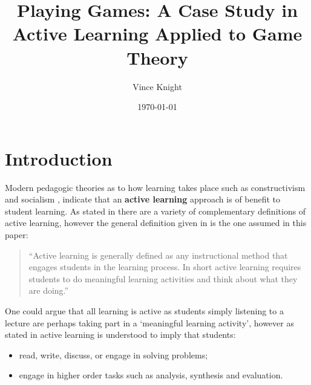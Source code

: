 \documentclass[12pt]{article}
\title{Playing Games: A Case Study in Active Learning Applied to Game Theory}
\author{Vince Knight}
\date{\today}
\begin{document}
\maketitle


\section{Introduction}\label{sec:introduction}

Modern pedagogic theories as to how learning takes place such as constructivism
and socialism \cite{Illeris2009, Jordan2008a}, indicate that an \textbf{active
learning} approach is of benefit to student learning.  As stated in
\cite{Prince2004} there are a variety of complementary definitions of active
learning, however the general definition given in \cite{Prince2004} is the one
assumed in this paper:

\begin{quote}
``Active learning is generally defined as any instructional method that engages
students in the learning process. In short active learning requires students to
do meaningful learning activities and think about what they are doing.''
\end{quote}

One could argue that all learning is active as students simply listening to a
lecture are perhaps taking part in a `meaningful learning activity', however as
stated in \cite{Bonwell1991} active learning is understood to imply that
students:

\begin{itemize}
    \item read, write, discuss, or engage in solving problems;
    \item engage in higher order tasks such as analysis, synthesis and
        evaluation.
\end{itemize}
\end{document}
